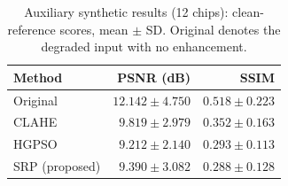 \begin{table}[t]\centering\footnotesize
\caption{Auxiliary synthetic results (12 chips): clean-reference scores, mean $\pm$ SD. Original denotes the degraded input with no enhancement.}
\label{tab:synthetic}\begin{tabular}{@{}lrr@{}}\toprule
Method & PSNR (dB) & SSIM \\\midrule
Original & $12.142 \pm 4.750$ & $0.518 \pm 0.223$ \\
CLAHE & $9.819 \pm 2.979$ & $0.352 \pm 0.163$ \\
HGPSO & $9.212 \pm 2.140$ & $0.293 \pm 0.113$ \\
SRP (proposed) & $9.390 \pm 3.082$ & $0.288 \pm 0.128$ \\
\bottomrule\end{tabular}\end{table}
